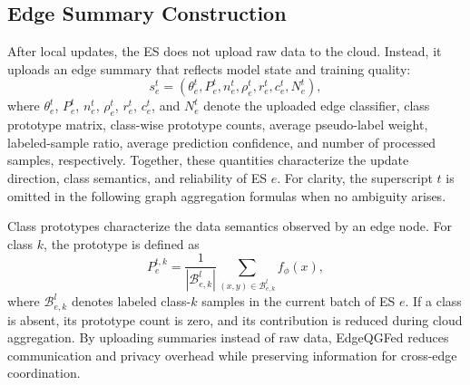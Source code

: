 ﻿\documentclass[10pt, conference, letterpaper]{ IEEEtran}
\begin{document}
\subsection{Edge Summary Construction}
\label{subsec:summary}
After local updates, the ES does not upload raw data to the cloud. Instead, it uploads an edge summary that reflects model state and training quality:
\begin{equation}
    s_e^t = \left(\theta_e^t, P_e^t, n_e^t, \rho_e^t, r_e^t, c_e^t, N_e^t\right),
    \label{eq:summary}
\end{equation}
where $\theta_e^t$, $P_e^t$, $n_e^t$, $\rho_e^t$, $r_e^t$, $c_e^t$, and $N_e^t$ denote the uploaded edge classifier, class prototype matrix, class-wise prototype counts, average pseudo-label weight, labeled-sample ratio, average prediction confidence, and number of processed samples, respectively. Together, these quantities characterize the update direction, class semantics, and reliability of ES $e$. For clarity, the superscript $t$ is omitted in the following graph aggregation formulas when no ambiguity arises.

Class prototypes characterize the data semantics observed by an edge node. For class $k$, the prototype is defined as
\begin{equation}
    P_e^{t,k} =
    \frac{1}{|\mathcal{B}_{e,k}^l|}
    \sum_{(x,y)\in\mathcal{B}_{e,k}^l} f_\phi(x),
    \label{eq:prototype}
\end{equation}
where $\mathcal{B}_{e,k}^l$ denotes labeled class-$k$ samples in the current batch of ES $e$. If a class is absent, its prototype count is zero, and its contribution is reduced during cloud aggregation. By uploading summaries instead of raw data, EdgeQGFed reduces communication and privacy overhead while preserving information for cross-edge coordination.
\end{document}
